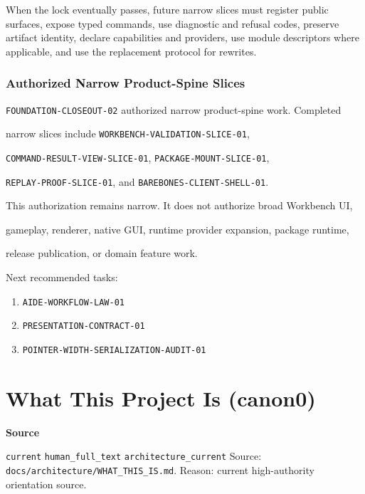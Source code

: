 \documentclass[9pt,a4paper,openany]{book}
\newcommand{\vonecallout}[3]{\par\medskip\noindent\begingroup\setlength{\fboxsep}{7pt}\colorbox{DomCalloutBg}{\parbox{0.94\linewidth}{\textbf{\textcolor{#1}{#2}}\par #3}}\endgroup\par\medskip}
\begin{document}
When the lock eventually passes, future narrow slices must register public surfaces, expose typed commands, use diagnostic and refusal codes, preserve artifact identity, declare capabilities and providers, use module descriptors where applicable, and use the replacement protocol for rewrites.\allowbreak{}


\subsubsection{Authorized Narrow Product-Spine Slices}

\texttt{FOUNDATION-\allowbreak{}CLOSEOUT-\allowbreak{}02} authorized narrow product-\allowbreak{}spine work.\allowbreak{} Completed

narrow slices include \texttt{WORKBENCH-\allowbreak{}VALIDATION-\allowbreak{}SLICE-\allowbreak{}01},

\texttt{COMMAND-\allowbreak{}RESULT-\allowbreak{}VIEW-\allowbreak{}SLICE-\allowbreak{}01}, \texttt{PACKAGE-\allowbreak{}MOUNT-\allowbreak{}SLICE-\allowbreak{}01},

\texttt{REPLAY-\allowbreak{}PROOF-\allowbreak{}SLICE-\allowbreak{}01}, and \texttt{BAREBONES-\allowbreak{}CLIENT-\allowbreak{}SHELL-\allowbreak{}01}.\allowbreak{}


This authorization remains narrow.\allowbreak{} It does not authorize broad Workbench UI,

gameplay, renderer, native GUI, runtime provider expansion, package runtime,

release publication, or domain feature work.\allowbreak{}


Next recommended tasks:


\begin{enumerate}
\item \texttt{AIDE-\allowbreak{}WORKFLOW-\allowbreak{}LAW-\allowbreak{}01}
\item \texttt{PRESENTATION-\allowbreak{}CONTRACT-\allowbreak{}01}
\item \texttt{POINTER-\allowbreak{}WIDTH-\allowbreak{}SERIALIZATION-\allowbreak{}AUDIT-\allowbreak{}01}
\end{enumerate}



\section{What This Project Is (canon0)}

\vonecallout{DomSlate}{Source}{\texttt{current} \texttt{human\_\allowbreak{}full\_\allowbreak{}text} \texttt{architecture\_\allowbreak{}current} Source: \texttt{docs/\allowbreak{}architecture/\allowbreak{}WHAT\_\allowbreak{}THIS\_\allowbreak{}IS.\allowbreak{}md}.\allowbreak{} Reason: current high-\allowbreak{}authority orientation source.\allowbreak{}}
\end{document}
